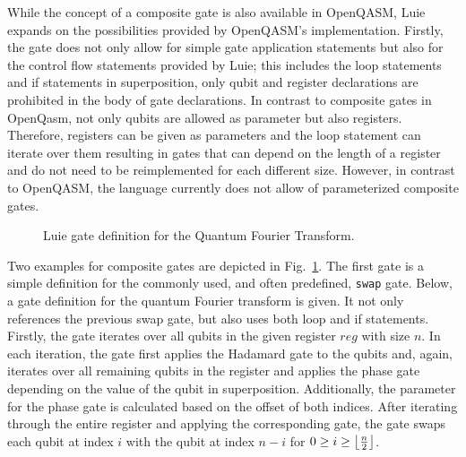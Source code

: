 While the concept of a composite gate is also available in OpenQASM, Luie expands on the possibilities provided by OpenQASM's implementation. Firstly, the gate does not only allow for simple gate application statements but also for the control flow statements provided by Luie; this includes the loop statements and if statements in superposition, only qubit and register declarations are prohibited in the body of gate declarations. In contrast to composite gates in OpenQasm, not only qubits are allowed as parameter but also registers. Therefore, registers can be given as parameters and the loop statement can iterate over them resulting in gates that can depend on the length of a register and do not need to be reimplemented for each different size. However, in contrast to OpenQASM, the language currently does not allow of parameterized composite gates.   

\begin{figure}[htp]
    \centering     
    
    \caption{Luie gate definition for the Quantum Fourier Transform.}
    \label{fig:qft_example}
\end{figure}

Two examples for composite gates are depicted in Fig.~\ref{fig:qft_example}. The first gate is a simple definition for the commonly used, and often predefined, \texttt{swap} gate. Below, a gate definition for the quantum Fourier transform is given. It not only references the previous swap gate, but also uses both loop and if statements. Firstly, the gate iterates over all qubits in the given register $reg$ with size $n$. In each iteration, the gate first applies the Hadamard gate to the qubits and, again, iterates over all remaining qubits in the register and applies the phase gate depending on the value of the qubit in superposition. Additionally, the parameter for the phase gate is calculated based on the offset of both indices. After iterating through the entire register and applying the corresponding gate, the gate swaps each qubit at index $i$ with the qubit at index $n - i$ for $0 \geq i \geq \floor*{\frac{n}{2}}$.